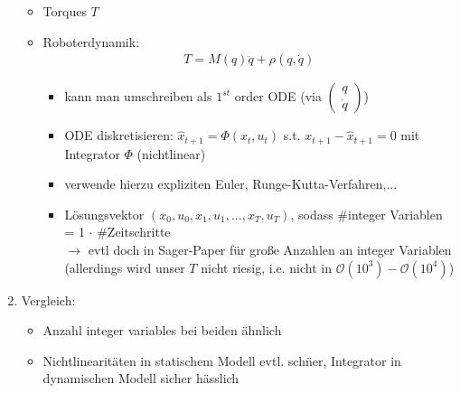 \documentclass{article}
\begin{document}
\begin{enumerate}
\begin{itemize}
	\item Torques $T$
	\item Roboterdynamik:
		\begin{align}
		T = M(q) \ddot{q} + \rho(q,\dot{q}) \label{eq:dynamic}
		\end{align}
		\begin{itemize}
		\item kann man umschreiben als $1^{st}$ order ODE (via $\begin{pmatrix} q\\\dot{q}\end{pmatrix}$)
		\item ODE diskretisieren: $\hat{x}_{t+1}= \Phi(x_t,u_t)$ s.t. $x_{t+1}-\hat{x}_{t+1}=0$ mit Integrator $\Phi$ (nichtlinear)
		\item verwende hierzu expliziten Euler, Runge-Kutta-Verfahren,...
		\item L\"osungsvektor $(x_0,u_0,x_1,u_1,...,x_T,u_T)$, sodass \#integer Variablen = 1 $\cdot$ \#Zeitschritte\\
		$\rightarrow$ evtl doch in Sager-Paper f\"ur gro\ss{}e Anzahlen an integer Variablen (allerdings wird unser $T$ nicht riesig, i.e. nicht in $\mathcal{O}(10^3) - \mathcal{O}(10^4)$)
		\end{itemize}
	\end{itemize}
\item Vergleich: 
	\begin{itemize}
	\item Anzahl integer variables bei beiden \"ahnlich
	\item Nichtlinearit\"aten in statischem Modell evtl. sch\"ner, Integrator in dynamischen Modell sicher h\"asslich
	\end{itemize}
\end{enumerate}

\newpage
\end{document}
